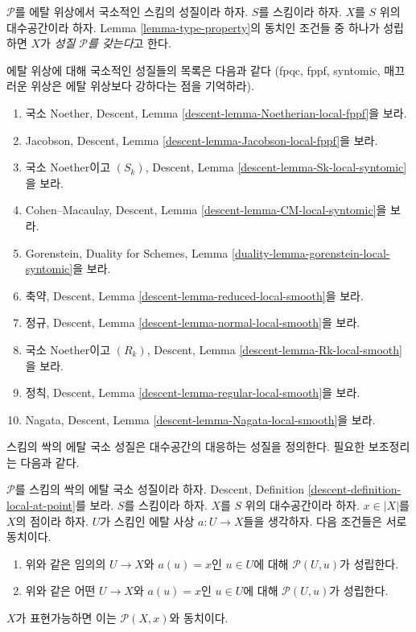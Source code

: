 \begin{definition}
\label{definition-type-property}
$\mathcal{P}$를 에탈 위상에서 국소적인 스킴의 성질이라 하자.
$S$를 스킴이라 하자.
$X$를 $S$ 위의 대수공간이라 하자.
Lemma \ref{lemma-type-property}의 동치인 조건들 중 하나가 성립하면
$X$가 {\it 성질 $\mathcal{P}$를 갖는다}고 한다.
\end{definition}

\begin{remark}
\label{remark-list-properties-local-etale-topology}
에탈 위상에 대해 국소적인 성질들의 목록은 다음과 같다
(fpqc, fppf, syntomic, 매끄러운 위상은 에탈 위상보다 강하다는 점을
기억하라).
\begin{enumerate}
\item 국소 Noether, Descent, Lemma
\ref{descent-lemma-Noetherian-local-fppf}을 보라.
\item Jacobson, Descent, Lemma
\ref{descent-lemma-Jacobson-local-fppf}을 보라.
\item 국소 Noether이고 $(S_k)$, Descent, Lemma
\ref{descent-lemma-Sk-local-syntomic}을 보라.
\item Cohen--Macaulay, Descent, Lemma
\ref{descent-lemma-CM-local-syntomic}을 보라.
\item Gorenstein, Duality for Schemes, Lemma
\ref{duality-lemma-gorenstein-local-syntomic}을 보라.
\item 축약, Descent, Lemma
\ref{descent-lemma-reduced-local-smooth}을 보라.
\item 정규, Descent, Lemma
\ref{descent-lemma-normal-local-smooth}을 보라.
\item 국소 Noether이고 $(R_k)$, Descent, Lemma
\ref{descent-lemma-Rk-local-smooth}을 보라.
\item 정칙, Descent, Lemma
\ref{descent-lemma-regular-local-smooth}을 보라.
\item Nagata, Descent, Lemma
\ref{descent-lemma-Nagata-local-smooth}을 보라.
\end{enumerate}
\end{remark}

\noindent
스킴의 싹의 에탈 국소 성질은 대수공간의 대응하는 성질을 정의한다.
필요한 보조정리는 다음과 같다.

\begin{lemma}
\label{lemma-local-source-target-at-point}
$\mathcal{P}$를 스킴의 싹의 에탈 국소 성질이라 하자. Descent, Definition
\ref{descent-definition-local-at-point}를 보라.
$S$를 스킴이라 하자.
$X$를 $S$ 위의 대수공간이라 하자.
$x \in |X|$를 $X$의 점이라 하자.
$U$가 스킴인 에탈 사상 $a : U \to X$들을 생각하자.
다음 조건들은 서로 동치이다.
\begin{enumerate}
\item 위와 같은 임의의 $U \to X$와 $a(u) = x$인 $u \in U$에 대해
$\mathcal{P}(U, u)$가 성립한다.
\item 위와 같은 어떤 $U \to X$와 $a(u) = x$인 $u \in U$에 대해
$\mathcal{P}(U, u)$가 성립한다.
\end{enumerate}
$X$가 표현가능하면 이는 $\mathcal{P}(X, x)$와 동치이다.
\end{lemma}

